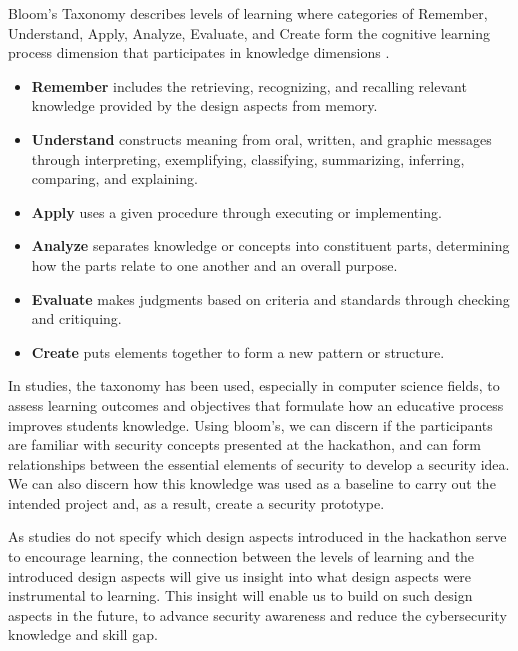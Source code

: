 \documentclass[runningheads]{llncs}
\begin{document}
Bloom's Taxonomy describes levels of learning where categories of Remember, Understand, Apply, Analyze, Evaluate, and Create form the cognitive learning process dimension that participates in knowledge dimensions \cite{bloom1956taxonomy,krathwohl2009taxonomy}.
\begin{itemize}
    \item \textbf{Remember} includes the retrieving, recognizing, and recalling relevant knowledge provided by the design aspects from memory.
    \item \textbf{Understand} constructs meaning from oral, written, and graphic messages through interpreting, exemplifying, classifying, summarizing, inferring, comparing, and explaining.
    \item \textbf{Apply} uses a given procedure through executing or implementing.
    \item \textbf{Analyze} separates knowledge or concepts into constituent parts, determining how the parts relate to one another and an overall purpose.
    \item \textbf{Evaluate} makes judgments based on criteria and standards through checking and critiquing.
    \item \textbf{Create} puts elements together to form a new pattern or structure.
\end{itemize}
In studies, the taxonomy has been used, especially in computer science fields, to assess learning outcomes and objectives that formulate how an educative process \cite{starr2008bloom,thompson2008bloom} improves students knowledge. Using bloom's, we can discern if the participants are familiar with security concepts presented at the hackathon, and can form relationships between the essential elements of security to develop a security idea. We can also discern how this knowledge was used as a baseline to carry out the intended project and, as a result, create a security prototype.

As studies do not specify which design aspects introduced in the hackathon serve to encourage learning, the connection between the levels of learning and the introduced design aspects will give us insight into what design aspects were instrumental to learning. This insight will enable us to build on such design aspects in the future, to advance security awareness and reduce the cybersecurity knowledge and skill gap.

\end{document}
